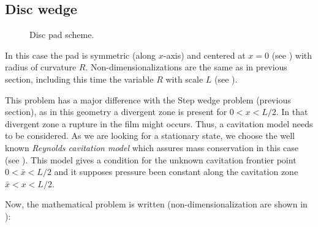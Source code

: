 \subsection{Disc wedge}
 \begin{figure}[h!]
 \centering 
 \def\svgwidth{\textwidth}	
\caption{Disc pad scheme.}\label{fig:pad_disc}
\end{figure}
In this case the pad is symmetric (along $x$-axis) and centered at $x=0$ (see ) with radius of curvature $R$. Non-dimensionalizations are the same as in previous section, including this time the variable $R$ with scale $L$ (see ).

This problem has a major difference with the Step wedge problem (previous section), as in this geometry a divergent zone is present for $0<x<L/2$. In that divergent zone a rupture in the film might occurs. Thus, a cavitation model needs to be considered. As we are looking for a stationary state, we choose the well known \emph{Reynolds cavitation model} which assures mass conservation in this case (see ). This model gives a condition for the unknown cavitation frontier point $0<\bar{x}<L/2$ and it supposes pressure been constant along the cavitation zone $\bar{x}<x<L/2$.

Now, the mathematical problem is written (non-dimensionalization are shown in ):

\\

